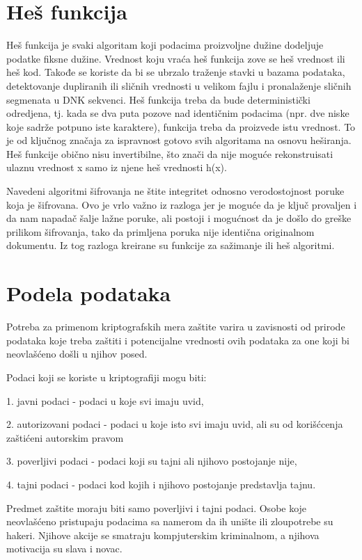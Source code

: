 \documentclass[a4paper]{article}
\begin{document}
\section{Heš funkcija}
\label{sec:heš_funkcija}
Heš funkcija je svaki algoritam koji podacima proizvoljne dužine dodeljuje podatke fiksne dužine. Vrednost koju vraća heš funkcija zove se heš vrednost ili heš kod.
Takođe se koriste da bi se ubrzalo traženje stavki u bazama podataka, detektovanje dupliranih ili sličnih vrednosti u velikom fajlu i pronalaženje sličnih segmenata u DNK sekvenci. Heš funkcija treba da bude deterministički odredjena, tj. kada se dva puta pozove nad identičnim podacima (npr. dve niske koje sadrže potpuno iste karaktere), funkcija treba da proizvede istu vrednost. To je od ključnog značaja za ispravnost gotovo svih algoritama na osnovu heširanja. Heš funkcije obično nisu invertibilne, što znači da nije moguće rekonstruisati ulaznu vrednost x samo iz njene heš vrednosti h(x).

Navedeni algoritmi šifrovanja ne štite integritet odnosno verodostojnost poruke koja je šifrovana. Ovo je vrlo važno iz razloga jer je moguće da je ključ provaljen i da nam napadač šalje lažne poruke, ali postoji i mogućnost da je došlo do greške prilikom šifrovanja, tako da primljena poruka nije identična originalnom dokumentu. Iz tog razloga kreirane su funkcije za sažimanje ili heš algoritmi.

\section{Podela podataka}
\label{sec:podela podataka}
Potreba za primenom kriptografskih mera zaštite varira u zavisnosti od prirode podataka koje treba zaštiti i potencijalne vrednosti ovih podataka za one koji bi neovlašćeno došli u njihov posed.

Podaci koji se koriste u kriptografiji mogu biti:

1. javni podaci - podaci u koje svi imaju uvid,

2. autorizovani podaci - podaci u koje isto svi imaju uvid, ali su od korišćcenja zaštićeni autorskim pravom

3. poverljivi podaci - podaci koji su tajni ali njihovo postojanje nije,

4. tajni podaci - podaci kod kojih i njihovo postojanje predstavlja tajnu.

Predmet zaštite moraju biti samo poverljivi i tajni podaci. Osobe koje neovlašćeno pristupaju podacima sa namerom da ih unište ili zloupotrebe su hakeri. Njihove akcije se smatraju kompjuterskim kriminalnom, a njihova motivacija su slava i novac.
\end{document}

